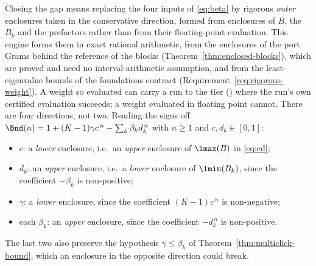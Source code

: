 \begin{remark}\label{rem:ia}
Closing the gap means replacing the four inputs of \eqref{eq:beta} by
rigorous \emph{outer} enclosures taken in the conservative direction, formed
from enclosures of $B$, the $B_k$ and the prefactors rather than from their
floating-point evaluation. This engine forms them in exact rational
arithmetic, from the enclosures of the port Grams behind the reference of the
blocks (Theorem~\ref{thm:enclosed-blocks}), which are proved and need no
interval-arithmetic assumption, and from the least-eigenvalue bounds of the
foundations contract (Requirement~\ref{req:rigorous-weight}). A weight so
evaluated can carry a run to the  tier
() where the run's own certified evaluation
succeeds; a weight evaluated in floating point cannot. There are four
directions, not two. Reading
the signs off $\Bnd(n)=1+(K-1)\gamma c^{\,n}-\sum_k\beta_kd_k^{\,n}$ with
$n\ge1$ and $c,d_k\in[0,1]$:
\begin{itemize}[leftmargin=1.6em]
\item $c$: a \emph{lower} enclosure, i.e.\ an \emph{upper} enclosure of
  $\lmax(B)$ in \eqref{eq:cd};
\item $d_k$: an \emph{upper} enclosure, i.e.\ a \emph{lower} enclosure of
  $\lmin(B_k)$, since the coefficient $-\beta_k$ is non-positive;
\item $\gamma$: a \emph{lower} enclosure, since the coefficient
  $(K-1)c^{\,n}$ is non-negative;
\item each $\beta_k$: an \emph{upper} enclosure, since the coefficient
  $-d_k^{\,n}$ is non-positive.
\end{itemize}
The last two also preserve the hypothesis $\gamma\le\beta_k$ of
Theorem~\ref{thm:multiclick-bound}, which an enclosure in the opposite direction could
break.


\end{remark}
